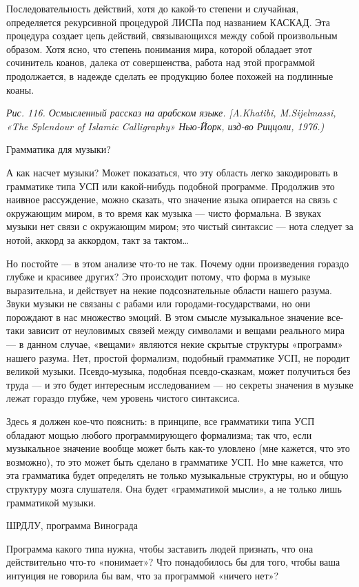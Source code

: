 Последовательность действий, хотя до какой-то степени и случайная, определяется рекурсивной процедурой ЛИСПа под названием КАСКАД. Эта процедура создает цепь действий, связывающихся между собой произвольным образом. Хотя ясно, что степень понимания мира, которой обладает этот сочинитель коанов, далека от совершенства, работа над этой программой продолжается, в надежде сделать ее продукцию более похожей на подлинные коаны.

\emph{Рис. 116. Осмысленный рассказ на арабском языке. {[}A.Khatibi, M.Sijelmassi, «The Splendour of Islamic Calligraphy» Нью-Йорк, изд-во Риццоли, 1976.)}

Грамматика для музыки?

А как насчет музыки? Может показаться, что эту область легко закодировать в грамматике типа УСП или какой-нибудь подобной программе. Продолжив это наивное рассуждение, можно сказать, что значение языка опирается на связь с окружающим миром, в то время как музыка --- чисто формальна. В звуках музыки нет связи с окружающим миром; это чистый синтаксис --- нота следует за нотой, аккорд за аккордом, такт за тактом\ldots{}

Но постойте --- в этом анализе что-то не так. Почему одни произведения гораздо глубже и красивее других? Это происходит потому, что форма в музыке выразительна, и действует на некие подсознательные области нашего разума. Звуки музыки не связаны с рабами или городами-государствами, но они порождают в нас множество эмоций. В этом смысле музыкальное значение все-таки зависит от неуловимых связей между символами и вещами реального мира --- в данном случае, «вещами» являются некие скрытые структуры «программ» нашего разума. Нет, простой формализм, подобный грамматике УСП, не породит великой музыки. Псевдо-музыка, подобная псевдо-сказкам, может получиться без труда --- и это будет интересным исследованием --- но секреты значения в музыке лежат гораздо глубже, чем уровень чистого синтаксиса.

Здесь я должен кое-что пояснить: в принципе, все грамматики типа УСП обладают мощью любого программирующего формализма; так что, если музыкальное значение вообще может быть как-то уловлено (мне кажется, что это возможно), то это может быть сделано в грамматике УСП. Но мне кажется, что эта грамматика будет определять не только музыкальные структуры, но и общую структуру мозга слушателя. Она будет «грамматикой мысли», а не только лишь грамматикой музыки.

ШРДЛУ, программа Винограда

Программа какого типа нужна, чтобы заставить людей признать, что она действительно что-то «понимает»? Что понадобилось бы для того, чтобы ваша интуиция не говорила бы вам, что за программой «ничего нет»?

